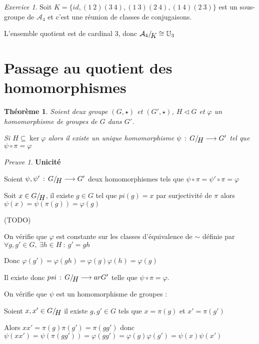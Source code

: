 \documentclass[]{article}
\newtheorem{mythm}{Théorème}
\theoremstyle{remark}
\newtheorem{myexer}{Exercice}
\newtheorem{myproof}{Preuve}
\theoremstyle{definition}
\newcommand{\funcshort}[3]{
#1 \, : \, #2 \longrightarrow #3
}
\newenvironment{proofpart}[1]{
	\noindent
	{\textbf{\boldmath #1}}
}{
	\checkmark
}
\newcommand*{\ClGa}[2]%
{\ensuremath{%
    #1/\!\raisebox{-.65ex}{\ensuremath{#2}}}}
\begin{document}
\begin{myexer}
	Soit $K=\{id, (1~2)(3~4),(1~3)(2~4),(1~4)(2~3)\}$ est un sous-groupe de $\mathcal{A}_4$ et c'est une réunion de classes de conjugaisons.
	
	L'ensemble quotient est de cardinal 3, donc $\ClGa{\mathcal{A}_4}{K} \cong \mathbb{U}_3$
\end{myexer}

\section{Passage au quotient des homomorphismes}

\begin{mythm}
	Soient deux groupe $(G, \star)$ et $(G', \star)$, $H \vartriangleleft G$  et $\varphi$ un homomorphisme de groupes de $G$ dans $G'$.
	
	Si $H \subseteq \ker \varphi$ alors il existe un unique homomorphisme $\funcshort{\psi}{\ClGa{G}{H}}{G'}$ tel que $\psi \circ \pi = \varphi$
\end{mythm}

\begin{myproof}
	\begin{proofpart}{Unicité}

		Soient $\funcshort{\psi, \psi'}{\ClGa{G}{H}}{G'}$ deux homomorphismes tels que $\psi \circ \pi = \psi' \circ \pi = \varphi$
		
		Soit $x \in \ClGa{G}{H}$, il existe $g \in G$ tel que $pi(g) = x$ par surjectivité de $\pi$ alors $\psi(x) = \psi(\pi(g)) = \varphi(g) $ 
		
		(TODO)
	\end{proofpart}
	
	\begin{proofpart}{}
		
		On vérifie que $\varphi$ est constante sur les classes d'équivalence de $\sim$ définie par $\forall g, g' \in G, ~ \exists h \in H ~ : ~ g' = g h$
		
		Donc $\varphi(g') = \varphi(gh)=\varphi(g)\varphi(h)=\varphi(g)$
		
		Il existe donc $\funcshort{psi}{\ClGa{G}{H}}{arG'}$ telle que $\psi \circ \pi = \varphi$.
		
		On vérifie que $\psi$ est un homomorphisme de groupes :
		
		Soient $x, x' \in \ClGa{G}{H}$ il existe $g, g' \in G$ tels que $x = \pi(g)$ et $x'=\pi(g')$
		
		Alors $x x' = \pi(g)\pi(g') = \pi(gg')$ donc $\psi(x x') = \psi(\pi(gg'))=\varphi(gg')=\varphi(g)\varphi(g')=\psi(x)\psi(x')$
	\end{proofpart}
\end{myproof}
\end{document}
